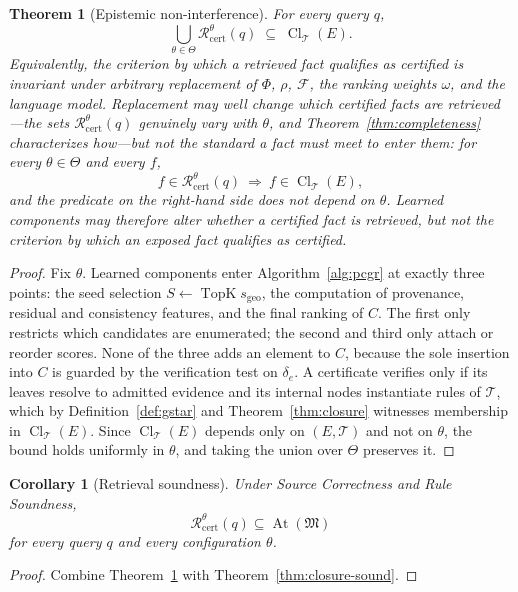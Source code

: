 \documentclass[11pt]{article}
\newtheorem{theorem}[definition]{Theorem}
\newtheorem{corollary}[definition]{Corollary}
\newcommand{\Cl}{\operatorname{Cl}}
\newcommand{\At}{\operatorname{At}}
\newcommand{\T}{\mathcal{T}}
\newcommand{\F}{\mathcal{F}}
\begin{document}
\begin{theorem}[Epistemic non-interference]
\label{thm:noninterference}
For every query $q$,
\[
\bigcup_{\theta\in\Theta}\mathcal{R}^{\theta}_{\mathrm{cert}}(q)\;\subseteq\;\Cl_{\T}(E).
\]
Equivalently, the \emph{criterion} by which a retrieved fact qualifies as certified is invariant under arbitrary replacement of $\Phi$, $\rho$, $\F$, the ranking weights $\omega$, and the language model. Replacement may well change \emph{which} certified facts are retrieved---the sets $\mathcal{R}^{\theta}_{\mathrm{cert}}(q)$ genuinely vary with $\theta$, and Theorem~\ref{thm:completeness} characterizes how---but not the standard a fact must meet to enter them: for every $\theta\in\Theta$ and every $f$,
\[
f\in\mathcal{R}^{\theta}_{\mathrm{cert}}(q)\ \Longrightarrow\ f\in\Cl_{\T}(E),
\]
and the predicate on the right-hand side does not depend on $\theta$. Learned components may therefore alter \emph{whether} a certified fact is retrieved, but not the criterion by which an exposed fact qualifies as certified.
\end{theorem}
\begin{proof}
Fix $\theta$. Learned components enter Algorithm~\ref{alg:pcgr} at exactly three points: the seed selection $S\gets\operatorname{TopK}s_{\mathrm{geo}}$, the computation of provenance, residual and consistency features, and the final ranking of $C$. The first only restricts which candidates are enumerated; the second and third only attach or reorder scores. None of the three adds an element to $C$, because the sole insertion into $C$ is guarded by the verification test on $\delta_{e}$. A certificate verifies only if its leaves resolve to admitted evidence and its internal nodes instantiate rules of $\T$, which by Definition~\ref{def:gstar} and Theorem~\ref{thm:closure} witnesses membership in $\Cl_{\T}(E)$. Since $\Cl_{\T}(E)$ depends only on $(E,\T)$ and not on $\theta$, the bound holds uniformly in $\theta$, and taking the union over $\Theta$ preserves it.
\end{proof}

\begin{corollary}[Retrieval soundness]
\label{cor:soundness}
Under Source Correctness and Rule Soundness,
\[
\mathcal{R}^{\theta}_{\mathrm{cert}}(q)\subseteq\At(\mathfrak{M})
\]
for every query $q$ and every configuration $\theta$.
\end{corollary}
\begin{proof}
Combine Theorem~\ref{thm:noninterference} with Theorem~\ref{thm:closure-sound}.
\end{proof}
\end{document}
